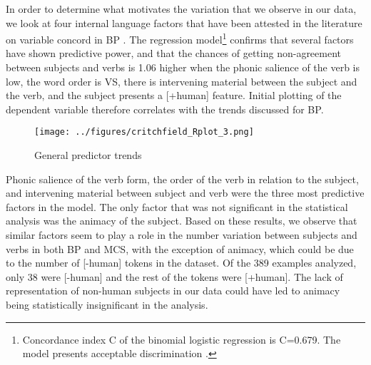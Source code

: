 \documentclass[output=paper,colorlinks,citecolor=brown,
]{langscibook}
\begin{document}
In order to determine what motivates the variation that we observe in our data, we look at four internal language factors that have been attested in the literature on variable concord in BP \citep{naro2000variable}. The regression model\footnote{Concordance index C of the binomial logistic regression is C=0.679. The model presents acceptable discrimination \citep[259]{levshina2015linguistics} .} confirms that several factors have shown predictive power, and that the chances of getting non-agreement between subjects and verbs is 1.06 higher when the phonic salience of the verb is low, the word order is VS, there is intervening material between the subject and the verb, and the subject presents a [+human] feature. Initial plotting of the dependent variable therefore correlates with the trends discussed for BP.

\newpage

\begin{figure}
   \texttt{[image: ../figures/critchfield\_Rplot\_3.png]}
    \caption{General predictor trends}
    \label{fig:critchfield:2}
\end{figure}



Phonic salience of the verb form, the order of the verb in relation to the subject, and intervening material between subject and verb were the three most predictive factors in the model. The only factor that was not significant in the statistical analysis was the animacy of the subject. Based on these results, we observe that similar factors seem to play a role in the number variation between subjects and verbs in both BP and MCS, with the exception of animacy, which could be due to the number of [-human] tokens in the dataset. Of the 389 examples analyzed, only 38 were [-human] and the rest of the tokens were [+human]. The lack of representation of non-human subjects in our data could have led to animacy being statistically insignificant in the analysis. 
\end{document}
